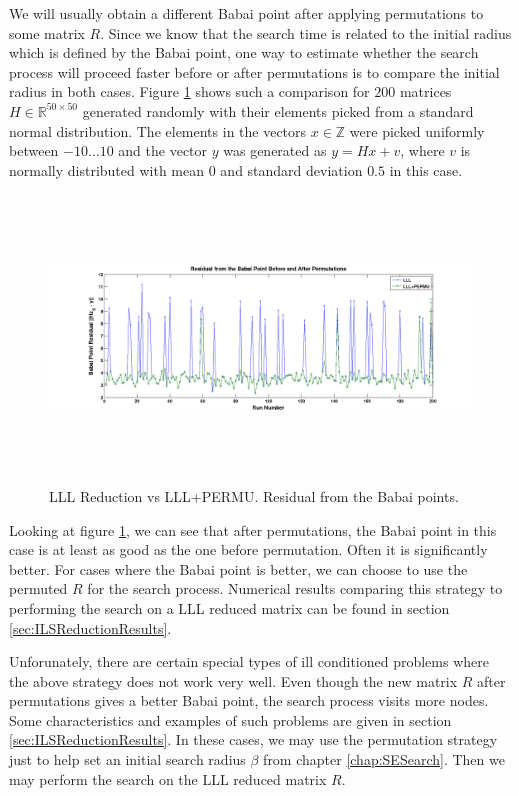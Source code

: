 \documentclass[12pt,Bold,letterpaper]{mcgilletdclass}
\begin{document}
We will usually obtain a different Babai point after applying permutations to some matrix $R$. Since we know that the search time is related to the initial radius which is defined by the Babai point, one way to estimate whether the search process will proceed faster before or after permutations is to compare the initial radius in both cases. Figure \ref{fig:LLLvsPermuBabai} shows such a comparison for $200$ matrices $H \in \mathbb{R}^{50 \times 50}$ generated randomly with their elements picked from a standard normal distribution. The elements in the vectors $x \in \mathbb{Z}$ were picked uniformly between $-10 \dots 10$ and the vector $y$ was generated as $y = Hx + v$, where $v$ is normally distributed with mean $0$ and standard deviation $0.5$ in this case.

\begin{figure}
\centering
\includegraphics[width=6in,height=3in]{lllvslllpermubabai.png}
\caption{LLL Reduction vs LLL+PERMU. Residual from the Babai points.}
\label{fig:LLLvsPermuBabai}
\end{figure}

Looking at figure \ref{fig:LLLvsPermuBabai}, we can see that after permutations, the Babai point in this case is at least as good as the one before permutation. Often it is significantly better. For cases where the Babai point is better, we can choose to use the permuted $R$ for the search process. Numerical results comparing this strategy to performing the search on a LLL reduced matrix can be found in section \ref{sec:ILSReductionResults}.

Unforunately, there are certain special types of ill conditioned problems where the above strategy does not work very well. Even though the new matrix $R$ after permutations gives a better Babai point, the search process visits more nodes. Some characteristics and examples of such problems are given in section \ref{sec:ILSReductionResults}. In these cases, we may use the permutation strategy just to help set an initial search radius $\beta$ from chapter \ref{chap:SESearch}. Then we may perform the search on the LLL reduced matrix $R$.
\end{document}
